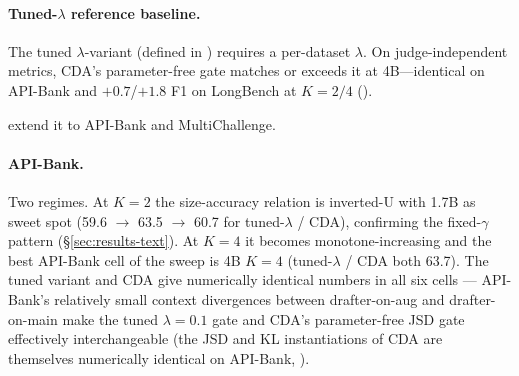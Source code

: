\documentclass[11pt]{article}
\theoremstyle{plain}
\theoremstyle{definition}
\begin{document}
\paragraph{Tuned-$\lambda$ reference baseline.}
The tuned $\lambda$-variant (defined in ) requires a per-dataset $\lambda$. On judge-independent metrics, CDA's parameter-free gate matches or exceeds it at 4B---identical on API-Bank and $+0.7$/$+1.8$ F1 on LongBench at $K{=}2/4$ ().


 extend it to API-Bank and MultiChallenge.

\paragraph{API-Bank.} Two regimes. At $K{=}2$ the size-accuracy relation is inverted-U with 1.7B as sweet spot (59.6 $\to$ 63.5 $\to$ 60.7 for tuned-$\lambda$ / CDA), confirming the fixed-$\gamma$ pattern (\S\ref{sec:results-text}). At $K{=}4$ it becomes monotone-increasing and the best API-Bank cell of the sweep is 4B $K{=}4$ (tuned-$\lambda$ / CDA both 63.7). The tuned variant and CDA give numerically identical numbers in all six cells --- API-Bank's relatively small context divergences between drafter-on-aug and drafter-on-main make the tuned $\lambda{=}0.1$ gate and CDA's parameter-free JSD gate effectively interchangeable (the JSD and KL instantiations of CDA are themselves numerically identical on API-Bank, ).
\end{document}
